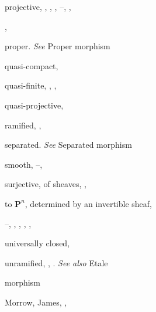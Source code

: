 {{\noindent\hspace*{7.5bp}projective, , , , --, ,\par
\noindent\hspace*{15.0bp}, \par
\noindent\hspace*{7.5bp}proper. \emph{See} Proper morphism\par
\noindent\hspace*{7.5bp}quasi-compact, \par
\noindent\hspace*{7.5bp}quasi-finite, , , \par
\noindent\hspace*{7.5bp}quasi-projective, \par
\noindent\hspace*{7.5bp}ramified, , \par
\noindent\hspace*{7.5bp}separated. \emph{See} Separated morphism\par
\noindent\hspace*{7.5bp}smooth, --, \par
\noindent\hspace*{7.5bp}surjective, of sheaves, , \par
\noindent\hspace*{7.5bp}to $\mathbf P^n$, determined by an invertible sheaf,\par
\noindent\hspace*{15.0bp}--, , , , , \par
\noindent\hspace*{7.5bp}universally closed, \par
\noindent\hspace*{7.5bp}unramified, , . \emph{See also} Etale\par
\noindent\hspace*{15.0bp}morphism\par
\noindent\hspace*{0.0bp}Morrow, James, , \par
}}
